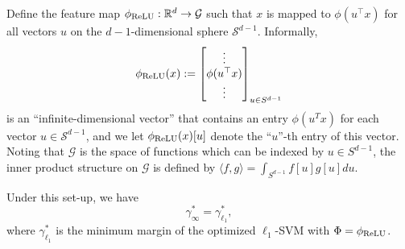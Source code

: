 \begin{theorem}\label{lec8:thm:thm8.5}
Define the feature map $\phi_{\text{ReLU}}: \mathbb{R}^d \to \mathcal{G}$ such that $x$ is mapped to $\phi(u^\top x)$ for all vectors $u$ on the $d-1$-dimensional sphere $\mathcal{S}^{d-1}$. Informally, 
$$\phi_{\text{ReLU}}(x) := \begin{bmatrix} \vdots \\ \phi(u^\top x) \\ \vdots \end{bmatrix}_{u\in S^{d-1}}$$
is an ``infinite-dimensional vector'' that contains an entry $\phi(u^T x)$ for each vector $u \in \mathcal{S}^{d-1}$, and we let $\phi_{\text{ReLU}}(x)[u]$ denote the ``$u$''-th entry of this vector. Noting that $\mathcal{G}$ is the space of functions which can be indexed by $u \in S^{d-1}$, the inner product structure on $\mathcal{G}$ is defined by $\langle f, g \rangle = \int_{S^{d-1}} f[u]g[u] du$.

Under this set-up, we have
\begin{equation}
\gamma_{\infty}^* = \gamma_{\ell_1}^*,
\end{equation}
where $\gamma_{\ell_1}^*$ is the minimum margin of the optimized $\ell_1$-SVM with $\Phi = \phi_{\text{ReLU}}$.
\end{theorem}

